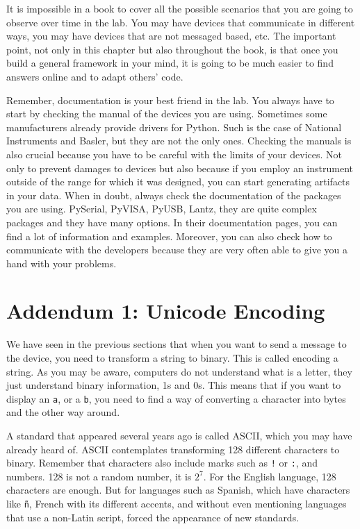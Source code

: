 It is impossible in a book to cover all the possible scenarios that you
are going to observe over time in the lab. You may have devices that
communicate in different ways, you may have devices that are not
messaged based, etc. The important point, not only in this chapter but
also throughout the book, is that once you build a general framework in
your mind, it is going to be much easier to find answers online and to
adapt others' code.

Remember, documentation is your best friend in the lab. You always have
to start by checking the manual of the devices you are using. Sometimes some manufacturers already provide drivers for Python. Such is the case of National Instruments and Basler, but they are not the only ones. Checking the manuals is also crucial because you have
to be careful with the limits of your devices. Not only to prevent damages to devices but also because if you employ an instrument
outside of the range for which it was designed, you can start generating
artifacts in your data. When in doubt, always check the documentation of the
packages you are using. PySerial, PyVISA, PyUSB, Lantz, they are quite complex
packages and they have many options. In their documentation pages, you
can find a lot of information and examples. Moreover, you can also check
how to communicate with the developers because they are very often able to give you a hand with your problems. 

\section{Addendum 1: Unicode Encoding}\label{section:unicode}
We have seen in the previous sections that when you want to send a message to the device, you need to transform a string to binary. This is called encoding a 
string. As you may be aware, computers do not understand what is a letter, they just understand binary information, 1s and 0s. This means that if you want to display an \texttt{a}, or a \texttt{b}, you need to find a way of converting a 
character into bytes and the other way around. 

A standard that appeared several years ago is called ASCII, which you may have already heard of. ASCII contemplates transforming 128 different characters to binary. Remember that characters also include marks such as \texttt{!} or 
\texttt{:}, and numbers. 128 is not a random number, it is $2^7$. For the English language, 128 characters are enough. But for languages such as Spanish, which have characters like \texttt{ñ}, French with its different accents, and without even mentioning languages that use a non-Latin script, forced the appearance of new standards. 

